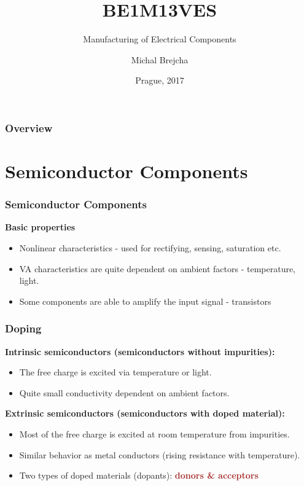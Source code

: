 \documentclass{beamer}
\title[BE1M13VES]{BE1M13VES}
\subtitle[Manufacturing of Electrical Components] {Manufacturing of Electrical Components}
\author[Brejcha]{Michal Brejcha}
\institute[CTU]{CTU in Prague}
\date[Prague, 2017]{Prague, 2017}
\begin{document}
\frame{\titlepage}

\begin{frame}
\frametitle{Overview} 
\tableofcontents
\end{frame}


\section{\texorpdfstring{Semiconductor Components}{Semiconductor Components}}
	\begin{frame}
    \frametitle{Semiconductor Components}
		\textbf{Basic properties}
		\begin{itemize}
		\item Nonlinear characteristics - used for rectifying, sensing, saturation etc.
		\item VA characteristics are quite dependent on ambient factors - temperature, light.
		\item Some components are able to amplify the input signal - transistors
		\end{itemize}
		
	\end{frame}
	\begin{frame}
    \frametitle{Doping}
		\small
		\textbf{Intrinsic semiconductors (semiconductors without impurities):}
		
		\begin{itemize}
			\item The free charge is excited via temperature or light.
			\item Quite small conductivity dependent on ambient factors.
		\end{itemize}
		
		\textbf{Extrinsic semiconductors (semiconductors with doped material):}
		
		\begin{itemize}
			\item Most of the free charge is excited at room temperature from impurities.
			\item Similar behavior as metal conductors (rising resistance with temperature).
			\item Two types of doped materials (dopants): \textbf{\textcolor{brown}{donors \& acceptors}}
		\end{itemize}
		
	\end{frame}
\end{document}
